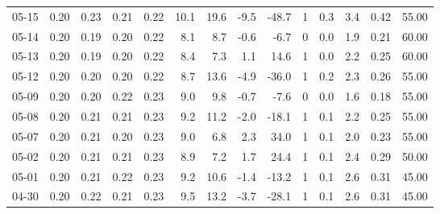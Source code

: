 \begin{threeparttable}
{\begin{tabular}{lrrrrrrrrrrrrr}
  05-15 &          0.20 &          0.23 &          0.21 &        0.22 &                10.1 &                19.6 &       -9.5 &        -48.7 &              1 &                 0.3 &              3.4 &            0.42 &                  55.00 \\
  05-14 &          0.20 &          0.19 &          0.20 &        0.22 &                 8.1 &                 8.7 &       -0.6 &         -6.7 &              0 &                 0.0 &              1.9 &            0.21 &                  60.00 \\
  05-13 &          0.20 &          0.19 &          0.20 &        0.22 &                 8.4 &                 7.3 &        1.1 &         14.6 &              1 &                 0.0 &              2.2 &            0.25 &                  60.00 \\
  05-12 &          0.20 &          0.20 &          0.20 &        0.22 &                 8.7 &                13.6 &       -4.9 &        -36.0 &              1 &                 0.2 &              2.3 &            0.26 &                  55.00 \\
  05-09 &          0.20 &          0.20 &          0.22 &        0.23 &                 9.0 &                 9.8 &       -0.7 &         -7.6 &              0 &                 0.0 &              1.6 &            0.18 &                  55.00 \\
  05-08 &          0.20 &          0.21 &          0.21 &        0.23 &                 9.2 &                11.2 &       -2.0 &        -18.1 &              1 &                 0.1 &              2.2 &            0.25 &                  55.00 \\
  05-07 &          0.20 &          0.21 &          0.20 &        0.23 &                 9.0 &                 6.8 &        2.3 &         34.0 &              1 &                 0.1 &              2.0 &            0.23 &                  55.00 \\
  05-02 &          0.20 &          0.21 &          0.21 &        0.23 &                 8.9 &                 7.2 &        1.7 &         24.4 &              1 &                 0.1 &              2.4 &            0.29 &                  50.00 \\
  05-01 &          0.20 &          0.21 &          0.22 &        0.23 &                 9.2 &                10.6 &       -1.4 &        -13.2 &              1 &                 0.1 &              2.6 &            0.31 &                  45.00 \\
  04-30 &          0.20 &          0.22 &          0.21 &        0.23 &                 9.5 &                13.2 &       -3.7 &        -28.1 &              1 &                 0.1 &              2.6 &            0.31 &                  45.00 \\

\end{tabular}}
\end{threeparttable}
